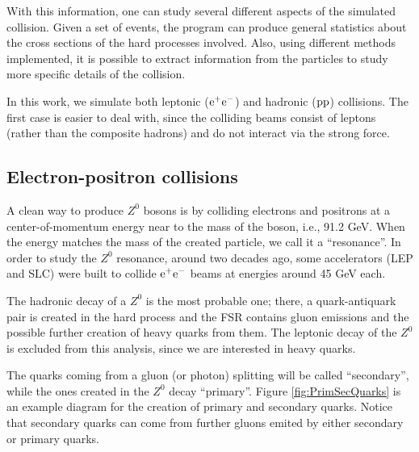 \documentclass[a4paper,12pt]{article}
\begin{document}
With this information, one can study several different aspects of the simulated collision. Given a set of events, the program can produce general statistics about the cross sections of the hard processes involved. Also, using different methods implemented, it is possible to extract information from the particles to study more specific details of the collision.

In this work, we simulate both leptonic (${\mathrm e}^+ {\mathrm e}^-$) and hadronic (${\mathrm p}{\mathrm p}$) collisions. The first case is easier to deal with, since the colliding beams consist of leptons (rather than the composite hadrons) and do not interact via the strong force.

\subsection{Electron-positron collisions}

A clean way to produce $Z^0$ bosons is by colliding electrons and positrons at a center-of-momentum energy near to the mass of the boson, i.e., 91.2 GeV. When the energy matches the mass of the created particle, we call it a ``resonance''. In order to study the $Z^0$ resonance, around two decades ago, some accelerators (LEP and SLC) were built to collide ${\mathrm e}^+{\mathrm e}^-$ beams at energies around 45 GeV each.

The hadronic decay of a $Z^0$ is the most probable one\cite{Beringer:1900zz}; there, a quark-antiquark pair is created in the hard process and the FSR contains gluon emissions and the possible further creation of heavy quarks from them. The leptonic decay of the $Z^0$ is excluded from this analysis, since we are interested in heavy quarks.

The quarks coming from a gluon (or photon) splitting will be called ``secondary'', while the ones created in the $Z^0$ decay ``primary''. Figure \ref{fig:PrimSecQuarks} is an example diagram for the creation of primary and secondary quarks. Notice that secondary quarks can come from further gluons emited by either secondary or primary quarks.
\end{document}
